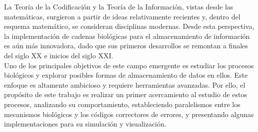 
La Teoría de la Codificación y la Teoría de la Información, vistas desde las matemáticas, surgieron a partir de ideas relativamente recientes y, dentro del esquema matemático, se consideran disciplinas modernas. Desde esta perspectiva, la implementación de cadenas biológicas para el almacenamiento de información es aún más innovadora, dado que sus primeros desarrollos se remontan a finales del siglo XX e inicios del siglo XXI.\\

Uno de los principales objetivos de este campo emergente es estudiar los procesos biológicos y explorar posibles formas de almacenamiento de datos en ellos. Este enfoque es altamente ambicioso y requiere herramientas avanzadas. Por ello, el propósito de este trabajo es realizar un primer acercamiento al estudio de estos procesos, analizando su comportamiento, estableciendo paralelismos entre los mecanismos biológicos y los códigos correctores de errores, y presentando algunas implementaciones para su simulación y visualización.